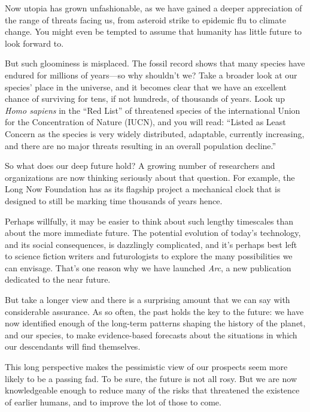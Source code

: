 Now utopia has grown unfashionable, as we have gained a deeper
appreciation of the range of threats facing us, from asteroid strike to
epidemic flu to climate change. You might even be tempted to assume that
humanity has little future to look forward to.

But such gloominess is misplaced. The fossil record shows that many
species have endured for millions of years---so why shouldn't we? Take a
broader look at our species' place in the universe, and it becomes clear
that we have an excellent chance of surviving for tens, if not hundreds,
of thousands of years. Look up \emph{Homo sapiens} in the ``Red List''
of threatened species of the international Union for the Concentration
of Nature (IUCN), and you will read: ``Listed as Least Concern as the
species is very widely distributed, adaptable, currently increasing, and
there are no major threats resulting in an overall population decline.''

So what does our deep future hold? A growing number of researchers and
organizations are now thinking seriously about that question. For
example, the Long Now Foundation has as its flagship project a
mechanical clock that is designed to still be marking time thousands of
years hence.

Perhaps willfully, it may be easier to think about such lengthy
timescales than about the more immediate future. The potential evolution
of today's technology, and its social consequences, is dazzlingly
complicated, and it's perhaps best left to science fiction writers and
futurologists to explore the many possibilities we can envisage. That's
one reason why we have
launched \emph{Arc}, a new publication
dedicated to the near future.

But take a longer view and there is a surprising amount that we can say
with considerable assurance. As so often, the past holds the key to the
future: we have now identified enough of the long-term patterns shaping
the history of the planet, and our species, to make evidence-based
forecasts about the situations in which our descendants will find
themselves.

This long perspective makes the pessimistic view of our prospects seem
more likely to be a passing fad. To be sure, the future is not all rosy.
But we are now knowledgeable enough to reduce many of the risks that
threatened the existence of earlier humans, and to improve the lot of
those to come.

